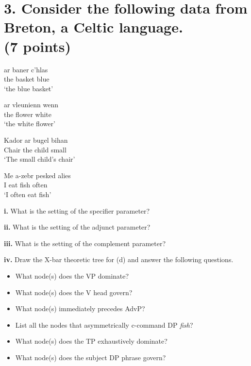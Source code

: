 \documentclass{article}
\begin{document}
\section{3. Consider the following data from Breton, a Celtic language. \\ \normalsize{(7 points)}}
\medskip
\setcounter{exx}{0}
\begin{exe}
  \ex
  \gll ar baner c'hlas \\
       the basket blue \\
  \glt `the blue basket'

  \ex
  \gll ar vleunienn wenn \\
       the flower white \\
  \glt `the white flower'

  \ex
  \gll Kador ar bugel bihan \\
       Chair the child small \\
  \glt `The small child's chair'

  \ex
  \gll Me a-zebr pesked alies \\
       I eat fish often \\
  \glt `I often eat fish'  
\end{exe}
\bigskip
\noindent \textbf{i.} What is the setting of the specifier parameter? \par
\vspace{2em}
\noindent \textbf{ii.} What is the setting of the adjunct parameter? \par
\vspace{2em}
\noindent \textbf{iii.} What is the setting of the complement parameter? \par
\vspace{2em}
\noindent \textbf{iv.} Draw the X-bar theoretic tree for (d) and answer the following questions.
\vspace{4cm}
\begin{itemize}
     \setlength{\itemsep}{1em}
     \item[(a)] What node(s) does the VP dominate?  
     \item[(b)] What node(s) does the V head govern?
     \item[(c)] What node(s) immediately precedes AdvP?
     \item[(d)] List all the nodes that asymmetrically c-command DP \textit{fish}? 
     \item[(e)] What node(s) does the TP exhaustively dominate? 
     \item[(f)] What node(s) does the subject DP phrase govern?
\end{itemize}
\end{document}
